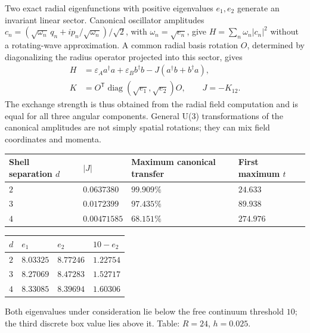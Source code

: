 \documentclass[a4paper,11pt]{article}
\newenvironment{drafttable}{\begin{center}\small\renewcommand{\arraystretch}{1.2}}{\end{center}}
\begin{document}
Two exact radial eigenfunctions with positive eigenvalues $e_1,e_2$ generate an invariant linear sector. Canonical oscillator amplitudes $c_n=(\sqrt{\omega_n}\,q_n+ip_n/\sqrt{\omega_n})/\sqrt2$, with $\omega_n=\sqrt{e_n}$, give $H=\sum_n\omega_n|c_n|^2$ without a rotating-wave approximation. A common radial basis rotation $O$, determined by diagonalizing the radius operator projected into this sector, gives
\begin{equation}\label{eq:twoMode}
\begin{aligned}
H&=\varepsilon_Aa^\dagger a+\varepsilon_Bb^\dagger b-J(a^\dagger b+b^\dagger a),\\
K&=O^\mathsf T\operatorname{diag}(\sqrt{e_1},\sqrt{e_2})O,\qquad J=-K_{12}.
\end{aligned}
\end{equation}
The exchange strength is thus obtained from the radial field computation and is equal for all three angular components. General U(3) transformations of the canonical amplitudes are not simply spatial rotations; they can mix field coordinates and momenta.

\begin{drafttable}
\begin{tabularx}{\linewidth}{@{}llXX@{}}\toprule
Shell separation $d$ & $|J|$ & Maximum canonical transfer & First maximum $t$\\\midrule
$2$ & $0.0637380$ & $99.909\%$ & $24.633$\\
$3$ & $0.0172399$ & $97.435\%$ & $89.938$\\
$4$ & $0.00471585$ & $68.151\%$ & $274.976$\\\bottomrule
\end{tabularx}
\end{drafttable}
\begin{drafttable}
\begin{tabular}{@{}llll@{}}\toprule
$d$ & $e_1$ & $e_2$ & $10-e_2$\\\midrule
$2$ & $8.03325$ & $8.77246$ & $1.22754$\\
$3$ & $8.27069$ & $8.47283$ & $1.52717$\\
$4$ & $8.33085$ & $8.39694$ & $1.60306$\\\bottomrule
\end{tabular}
\end{drafttable}
{\small Both eigenvalues under consideration lie below the free continuum threshold $10$; the third discrete box value lies above it. Table: $R=24$, $h=0.025$.\par}
\end{document}
